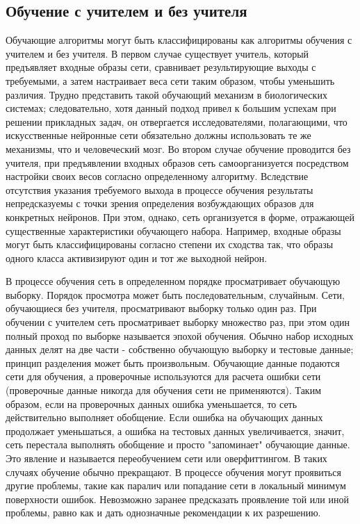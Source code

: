 \documentclass[a4paper,12pt]{report}
\begin{document}
\subsection{Обучение с учителем и без учителя}
Обучающие алгоритмы могут быть классифицированы как алгоритмы обучения с учителем и без учителя. В первом случае существует учитель, который предъявляет входные образы сети, сравнивает результирующие выходы с требуемыми, а затем настраивает веса сети таким образом, чтобы уменьшить различия. Трудно представить такой обучающий механизм в биологических системах; следовательно, хотя данный подход привел к большим успехам при решении прикладных задач, он отвергается исследователями, полагающими, что искусственные нейронные сети обязательно должны использовать те же механизмы, что и человеческий мозг. Во втором случае обучение проводится без учителя, при предъявлении входных образов сеть самоорганизуется посредством настройки своих весов согласно определенному алгоритму. Вследствие отсутствия указания требуемого выхода в процессе обучения результаты непредсказуемы с точки зрения определения возбуждающих образов для конкретных нейронов. При этом, однако, сеть организуется в форме, отражающей существенные характеристики обучающего набора. Например, входные образы могут быть классифицированы согласно степени их сходства так, что образы одного класса активизируют один и тот же выходной нейрон. 

В процессе обучения сеть в определенном порядке просматривает обучающую выборку. Порядок просмотра может быть последовательным, случайным. Сети, обучающиеся без учителя, просматривают выборку только один раз. При обучении с учителем сеть просматривает выборку множество раз, при этом один полный проход по выборке называется эпохой обучения. Обычно набор исходных данных делят на две части - собственно обучающую выборку и тестовые данные; принцип разделения может быть произвольным. Обучающие данные подаются сети для обучения, а проверочные используются для расчета ошибки сети (проверочные данные никогда для обучения сети не применяются). Таким образом, если на проверочных данных ошибка уменьшается, то сеть действительно выполняет обобщение. Если ошибка на обучающих данных продолжает уменьшаться, а ошибка на тестовых данных увеличивается, значит, сеть перестала выполнять обобщение и просто "запоминает" обучающие данные. Это явление и называется переобучением сети или оверфиттингом. В таких случаях обучение обычно прекращают. В процессе обучения могут проявиться другие проблемы, такие как паралич или попадание сети в локальный минимум поверхности ошибок. Невозможно заранее предсказать проявление той или иной проблемы, равно как и дать однозначные рекомендации к их разрешению.
\end{document}
